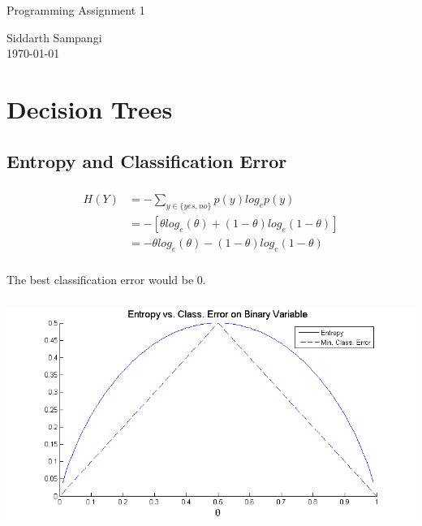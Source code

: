 \documentclass[paper=letterpaper,fontsize=11pt]{article}
\newcommand{\thetitle}{Programming Assignment 1}
\newcommand{\theauthor}{Siddarth Sampangi}
\numberwithin{equation}{section}
\numberwithin{table}{section} %
\numberwithin{figure}{section}
\begin{document}
\parbox{\linewidth}{ %
\parbox{.08\linewidth}{}\hfill %
\parbox{.73\linewidth}{\fontsize{24}{20}\selectfont\thetitle}\hfill %
\parbox{.19\linewidth}{\raggedleft\fontsize{12}{14}\theauthor\\\today} %
}
\horrule[2pt][-3.5pt][-6pt] %
\normalsize %


\section{Decision Trees}
\subsection{Entropy and Classification Error}
\subsubsection{}
\begin{align*}
H(Y) &= -\sum^{}_{y \in \{yes,no\}}p(y)log_{e}p(y)\\
&= -[\theta log_{e}(\theta)+(1-\theta)log_{e}(1-\theta)]\\
&= -\theta log_{e}(\theta)-(1-\theta)log_{e}(1-\theta)
\end{align*}
\subsubsection{}
The best classification error would be 0.
\subsubsection{}
\begin{center}
	\includegraphics[scale=0.8]{assets/p1a3.png}
\end{center}
\end{document}
